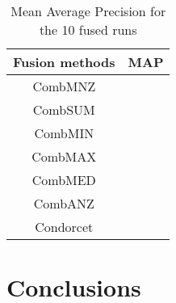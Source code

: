 		\begin{table}[H]
		    \centering
		    \begin{tabular}{c p{4cm}}
		    \toprule
		    \textbf{Fusion methods} & \textbf{MAP} \\ \toprule
		    CombMNZ &  \\ \hline
		    CombSUM &  \\ \hline
		    CombMIN &  \\ \hline
		    CombMAX &  \\ \hline
		    CombMED &  \\ \hline
		    CombANZ &  \\ \hline
			Condorcet &  \\ \bottomrule
		    \end{tabular}
		    \caption{Mean Average Precision for the 10 fused runs}
		\end{table}

	\section{Conclusions}
	



